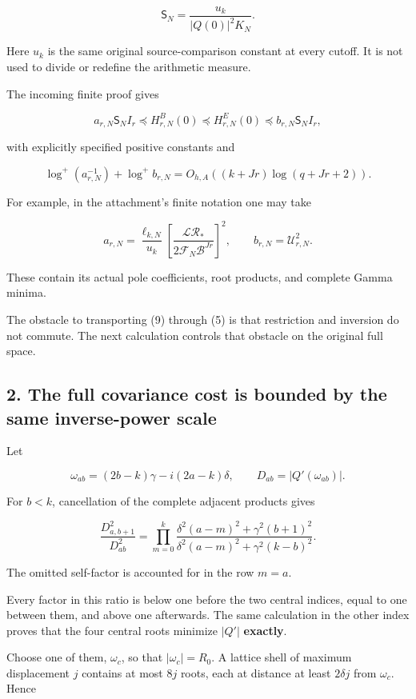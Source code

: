 \documentclass[11pt]{article}
\begin{document}
\[
\boxed{
\mathsf S_N=
\frac{u_k}{|Q(0)|^2K_N}.
}
\tag{8}
\]

Here \(u_k\) is the same original source-comparison constant at every cutoff. It is not used to divide or redefine the arithmetic measure.

The incoming finite proof gives

\[
a_{r,N}\mathsf S_N I_r
\preceq H^B_{r,N}(0)
\preceq H^E_{r,N}(0)
\preceq b_{r,N}\mathsf S_N I_r,
\tag{9}
\]

with explicitly specified positive constants and

\[
\log^+(a_{r,N}^{-1})+\log^+b_{r,N}
=
O_{h,A}((k+Jr)\log(q+Jr+2)).
\]

For example, in the attachment's finite notation one may take

\[
a_{r,N}
=
\frac{\ell_{k,N}}{u_k}
\left[
\frac{\mathcal L\mathcal R_*}
{2\mathcal F_N\mathcal B^{Jr}}
\right]^2,
\qquad
b_{r,N}=\mathcal U_{r,N}^2.
\]

These contain its actual pole coefficients, root products, and complete Gamma minima.

The obstacle to transporting (9) through (5) is that restriction and inversion do not commute. The next calculation controls that obstacle on the original full space.

\subsection{2. The full covariance cost is bounded by the same inverse-power scale}\label{the-full-covariance-cost-is-bounded-by-the-same-inverse-power-scale}

Let

\[
\omega_{ab}=(2b-k)\gamma-i(2a-k)\delta,
\qquad
D_{ab}=|Q'(\omega_{ab})|.
\]

For \(b<k\), cancellation of the complete adjacent products gives

\[
\boxed{
\frac{D_{a,b+1}^2}{D_{ab}^2}
=
\prod_{m=0}^{k}
\frac{\delta^2(a-m)^2+\gamma^2(b+1)^2}
{\delta^2(a-m)^2+\gamma^2(k-b)^2}.
}
\tag{10}
\]

The omitted self-factor is accounted for in the row \(m=a\).

Every factor in this ratio is below one before the two central indices, equal to one between them, and above one afterwards. The same calculation in the other index proves that the four central roots minimize \(|Q'|\) \textbf{exactly}.

Choose one of them, \(\omega_c\), so that \(|\omega_c|=R_0\). A lattice shell of maximum displacement \(j\) contains at most \(8j\) roots, each at distance at least \(2\delta j\) from \(\omega_c\). Hence
\end{document}
